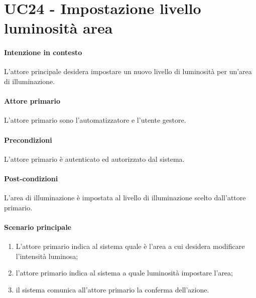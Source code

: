 \section{UC24 - Impostazione livello luminosità area}\label{uc:24}
\paragraph{Intenzione in contesto} L'attore principale desidera impostare un nuovo livello di luminosità per un'area di illuminazione.
\paragraph{Attore primario} L'attore primario sono l'automatizzatore e l'utente gestore.
\paragraph{Precondizioni} L'attore primario è autenticato ed autorizzato dal sistema.
\paragraph{Post-condizioni} L'area di illuminazione è impostata al livello di illuminazione scelto dall'attore primario.
\paragraph{Scenario principale}
\begin{enumerate}
    \item L'attore primario indica al sistema quale è l'area a cui desidera modificare l'intensità luminosa;
    \item l'attore primario indica al sistema a quale luminosità impostare l'area;
    \item il sistema comunica all'attore primario la conferma dell'azione.
\end{enumerate}